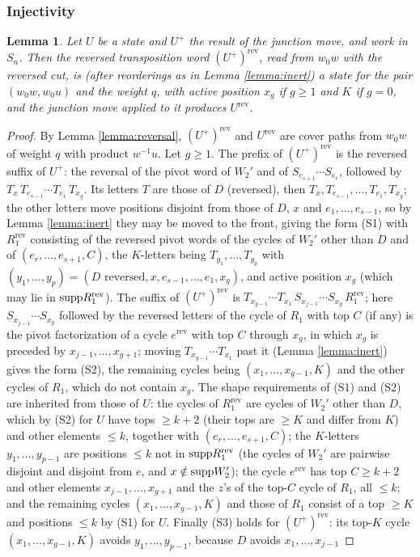 \documentclass{amsart}
\newtheorem{lemma}{Lemma}[section]
\theoremstyle{definition}
\theoremstyle{remark}
\numberwithin{equation}{section}
\begin{document}
\subsubsection*{Injectivity}

\begin{lemma} \label{lemma:reversestate}
Let $U$ be a state and $U^+$ the result of the junction move, and work in $S_n$. Then the reversed transposition word $(U^+)^{\mathrm{rev}}$, read from $w_0w$ with the reversed cut, is (after reorderings as in Lemma \ref{lemma:inert}) a state for the pair $(w_0w,w_0u)$ and the weight $q$, with active position $x_g$ if $g\geq1$ and $K$ if $g=0$, and the junction move applied to it produces $U^{\mathrm{rev}}$.
\end{lemma}
\begin{proof}
By Lemma \ref{lemma:reversal}, $(U^+)^{\mathrm{rev}}$ and $U^{\mathrm{rev}}$ are cover paths from $w_0w$ of weight $q$ with product $w^{-1}u$. Let $g\geq1$. The prefix of $(U^+)^{\mathrm{rev}}$ is the reversed suffix of $U^+$: the reversal of the pivot word of $W_2'$ and of $S_{e_{s+1}}\cdots S_{e_r}$, followed by $T_x\,T_{e_{s-1}}\cdots T_{e_1}\,T_{x_g}$. Its letters $T$ are those of $D$ (reversed), then $T_x,T_{e_{s-1}},\ldots,T_{e_1},T_{x_g}$; the other letters move positions disjoint from those of $D$, $x$ and $e_1,\ldots,e_{s-1}$, so by Lemma \ref{lemma:inert} they may be moved to the front, giving the form (S1) with $R_1^{\mathrm{rev}}$ consisting of the reversed pivot words of the cycles of $W_2'$ other than $D$ and of $(e_r,\ldots,e_{s+1},C)$, the $K$-letters being $T_{y_1},\ldots,T_{y_{p}}$ with $(y_1,\ldots,y_p)=(D\text{ reversed},x,e_{s-1},\ldots,e_1,x_g)$, and active position $x_g$ (which may lie in $\mathrm{supp} R_1^{\mathrm{rev}}$). The suffix of $(U^+)^{\mathrm{rev}}$ is $T_{x_{g-1}}\cdots T_{x_1}\,S_{x_{j-1}}\cdots S_{x_g}\,R_1^{\mathrm{rev}}$; here $S_{x_{j-1}}\cdots S_{x_g}$ followed by the reversed letters of the cycle of $R_1$ with top $C$ (if any) is the pivot factorization of a cycle $e^{\mathrm{rev}}$ with top $C$ through $x_g$, in which $x_g$ is preceded by $x_{j-1},\ldots,x_{g+1}$; moving $T_{x_{g-1}}\cdots T_{x_1}$ past it (Lemma \ref{lemma:inert}) gives the form (S2), the remaining cycles being $(x_1,\ldots,x_{g-1},K)$ and the other cycles of $R_1$, which do not contain $x_g$. The shape requirements of (S1) and (S2) are inherited from those of $U$: the cycles of $R_1^{\mathrm{rev}}$ are cycles of $W_2'$ other than $D$, which by (S2) for $U$ have tops $\geq k+2$ (their tops are $\geq K$ and differ from $K$) and other elements $\leq k$, together with $(e_r,\ldots,e_{s+1},C)$; the $K$-letters $y_1,\ldots,y_{p-1}$ are positions $\leq k$ not in $\mathrm{supp} R_1^{\mathrm{rev}}$ (the cycles of $W_2'$ are pairwise disjoint and disjoint from $e$, and $x\notin\mathrm{supp} W_2'$); the cycle $e^{\mathrm{rev}}$ has top $C\geq k+2$ and other elements $x_{j-1},\ldots,x_{g+1}$ and the $z$'s of the top-$C$ cycle of $R_1$, all $\leq k$; and the remaining cycles $(x_1,\ldots,x_{g-1},K)$ and those of $R_1$ consist of a top $\geq K$ and positions $\leq k$ by (S1) for $U$. Finally (S3) holds for $(U^+)^{\mathrm{rev}}$: its top-$K$ cycle $(x_1,\ldots,x_{g-1},K)$ avoids $y_1,\ldots,y_{p-1}$, because $D$ avoids $x_1,\ldots,x_{j-1}$ 
\end{proof}
\end{document}
